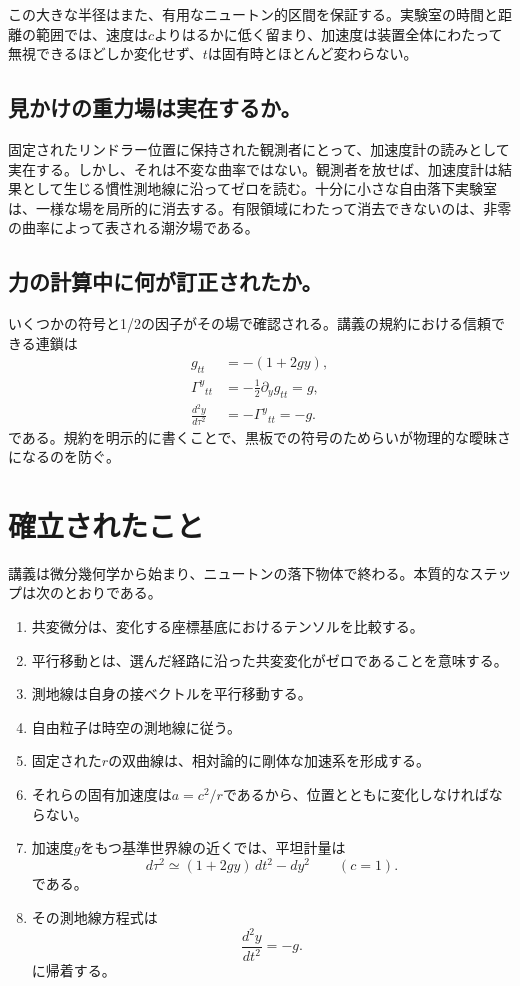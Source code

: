この大きな半径はまた、有用なニュートン的区間を保証する。実験室の時間と距離の範囲では、速度は\(c\)よりはるかに低く留まり、加速度は装置全体にわたって無視できるほどしか変化せず、\(t\)は固有時とほとんど変わらない。

\subsection{見かけの重力場は実在するか。}

固定されたリンドラー位置に保持された観測者にとって、加速度計の読みとして実在する。しかし、それは不変な曲率ではない。観測者を放せば、加速度計は結果として生じる慣性測地線に沿ってゼロを読む。十分に小さな自由落下実験室は、一様な場を局所的に消去する。有限領域にわたって消去できないのは、非零の曲率によって表される潮汐場である。

\subsection{力の計算中に何が訂正されたか。}

いくつかの符号と1/2の因子がその場で確認される。講義の規約における信頼できる連鎖は
\begin{equation}
\begin{aligned}
g_{tt}&=-(1+2gy),\\
\Gamma^y{}_{tt}&=-\frac12\partial_yg_{tt}=g,\\
\frac{d^2y}{d\tau^2}&=-\Gamma^y{}_{tt}=-g.
\end{aligned}
\end{equation}
である。規約を明示的に書くことで、黒板での符号のためらいが物理的な曖昧さになるのを防ぐ。

\section{確立されたこと}

講義は微分幾何学から始まり、ニュートンの落下物体で終わる。本質的なステップは次のとおりである。
\begin{enumerate}
\item 共変微分は、変化する座標基底におけるテンソルを比較する。
\item 平行移動とは、選んだ経路に沿った共変変化がゼロであることを意味する。
\item 測地線は自身の接ベクトルを平行移動する。
\item 自由粒子は時空の測地線に従う。
\item 固定された\(r\)の双曲線は、相対論的に剛体な加速系を形成する。
\item それらの固有加速度は\(a=c^2/r\)であるから、位置とともに変化しなければならない。
\item 加速度\(g\)をもつ基準世界線の近くでは、平坦計量は
\begin{equation}
d\tau^2\simeq(1+2gy)\,dt^2-dy^2
\qquad(c=1).
\end{equation}
である。
\item その測地線方程式は
\begin{equation}
\frac{d^2y}{dt^2}=-g.
\end{equation}
に帰着する。
\end{enumerate}

